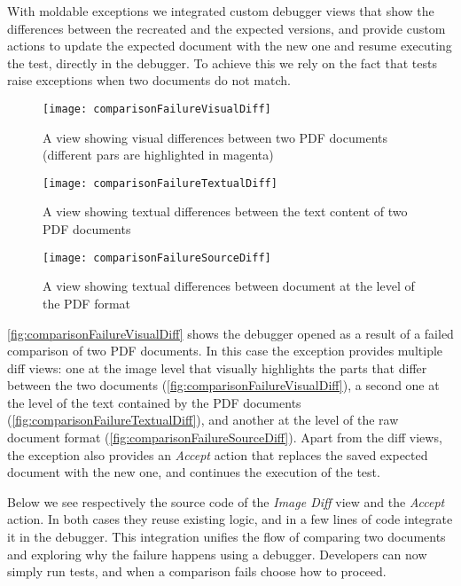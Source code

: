 \documentclass[sigplan,anonymous,review,10pt]{acmart}
\begin{document}
With moldable exceptions we integrated custom debugger views that show the differences between the recreated and the expected versions, and provide custom actions to update the expected document with the new one and resume executing the test, directly in the debugger.
To achieve this we rely on the fact that tests raise  exceptions when two documents do not match.

\begin{figure*}[h]
  \texttt{[image: comparisonFailureVisualDiff]}
  \caption{A view showing visual differences between two PDF documents (different pars are highlighted in magenta)}
  \label{fig:comparisonFailureVisualDiff}
\end{figure*}

\begin{figure*}[h]
  \texttt{[image: comparisonFailureTextualDiff]}
  \caption{A view showing textual differences between the text content of two PDF documents}
  \label{fig:comparisonFailureTextualDiff}
\end{figure*}

\begin{figure*}[h]
  \texttt{[image: comparisonFailureSourceDiff]}
  \caption{A view showing textual differences between document at the level of the PDF format}
  \label{fig:comparisonFailureSourceDiff}
\end{figure*}


\autoref{fig:comparisonFailureVisualDiff} shows the debugger opened as a result of a failed comparison of two PDF documents. 
In this case the exception provides multiple diff views:
one at the image level that visually highlights the parts that differ between the two documents (\autoref{fig:comparisonFailureVisualDiff}),
a second one at the level of the text contained by the PDF documents (\autoref{fig:comparisonFailureTextualDiff}),
and another at the level of the raw document format (\autoref{fig:comparisonFailureSourceDiff}).
Apart from the diff views, the exception also provides an \emph{Accept} action that replaces the saved expected document with the new one, and continues the execution of the test.

Below we see respectively the source code of the \emph{Image Diff} view and the \emph{Accept} action. 
In both cases they reuse existing logic, and in a few lines of code integrate it in the debugger. 
This integration unifies the flow of comparing two documents and exploring why the failure happens using a debugger. 
Developers can now simply run tests, and when a comparison fails choose how to proceed.
\end{document}

